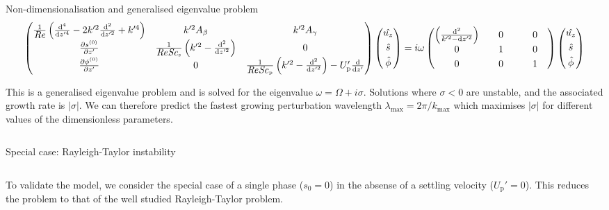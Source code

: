 \documentclass[final]{beamer} %
\newcommand\Rey{\mbox{\textit{Re}}}  %
\newcommand\Sc{\mbox{\textit{Sc}}}  %
\begin{document}
\begin{frame}[t]
\begin{columns}[t]
\begin{column}{0.6\paperwidth}
\begin{block}{Non-dimensionalisation and generalised eigenvalue problem}
        $$ \begin{pmatrix}
          \frac{1}{\Rey}\left(\frac{\mathrm{d}^{4}}{\mathrm{d} z'^{4}} - 2 k'^{2} \frac{\mathrm{d}^{2}}{\mathrm{d} z'^{2}} + k'^{4}\right) &  k'^{2} A_{\beta} & k'^{2} A_{\gamma} \\[0.3em]
          \frac{\partial s^{(0)}}{\partial z'} & \frac{1}{\Rey \Sc_{\text{s}}} \left(k'^{2} - \frac{\mathrm{d}^{2}}{\mathrm{d} z'^{2}} \right) & 0 \\[0.3em]
          \frac{\partial \phi^{(0)}}{\partial z'} & 0 & \frac{1}{\Rey \Sc_{\text{p}}} \left(k'^{2} - \frac{\mathrm{d}^{2}}{\mathrm{d} z'^{2}} \right) - U_{\text{p}}' \frac{\mathrm{d}}{\mathrm{d} z'} 
        \end{pmatrix} \begin{pmatrix}
              \hat{u_{z}} \\[0.3em]
              \hat{s} \\[0.3em]
              \hat{\phi}
        \end{pmatrix} = i \omega \begin{pmatrix}
              \left(\frac{\mathrm{d}^{2}}{k'^{2} - \mathrm{d} z'^{2}}\right) &  \quad 0 \quad & \quad 0 \quad \\[0.3em]
              0 & 1 & 0 \\[0.3em]
              0 & 0 & 1
        \end{pmatrix} \begin{pmatrix}
              \hat{u_{z}} \\[0.3em]
              \hat{s} \\[0.3em]
              \hat{\phi}
        \end{pmatrix}$$

        \vspace{1cm}
        
        \centering This is a generalised eigenvalue problem and is solved for the eigenvalue $\omega = \Omega + i \sigma$. Solutions where $\sigma < 0$ are unstable, and the associated growth rate is $|\sigma|$. We can therefore predict the fastest growing perturbation wavelength $\lambda_{\text{max}} = 2 \pi / k_{\text{max}}$ which maximises $|\sigma|$ for different values of the dimensionless parameters. 
      \end{block}

    \end{column}

  \end{columns}

  \begin{block}{Special case: Rayleigh-Taylor instability}
    \begin{columns}[t]
      \begin{column}{0.3\paperwidth}
        \centering To validate the model, we consider the special case of a single phase ($s_{0} = 0$) in the absense of a settling velocity ($U_{\text{p}}' = 0$). This reduces the problem to that of the well studied Rayleigh-Taylor problem. 


\end{column}
\end{columns}
\end{block}
\end{frame}
\end{document}
